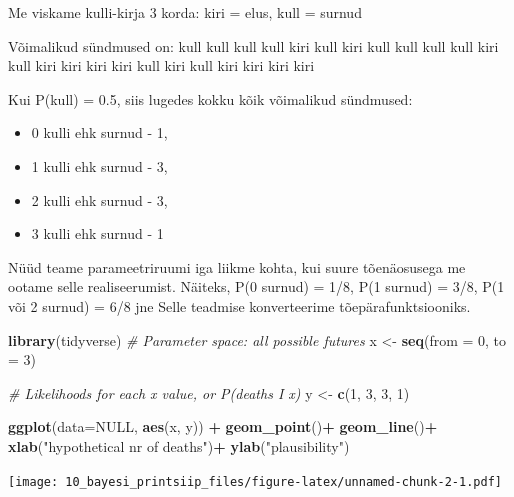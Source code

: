 \documentclass[]{book}
\newenvironment{Shaded}{\begin{snugshade}}{\end{snugshade}}
\newcommand{\KeywordTok}[1]{\textcolor[rgb]{0.13,0.29,0.53}{\textbf{#1}}}
\newcommand{\DataTypeTok}[1]{\textcolor[rgb]{0.13,0.29,0.53}{#1}}
\newcommand{\DecValTok}[1]{\textcolor[rgb]{0.00,0.00,0.81}{#1}}
\newcommand{\StringTok}[1]{\textcolor[rgb]{0.31,0.60,0.02}{#1}}
\newcommand{\CommentTok}[1]{\textcolor[rgb]{0.56,0.35,0.01}{\textit{#1}}}
\newcommand{\OtherTok}[1]{\textcolor[rgb]{0.56,0.35,0.01}{#1}}
\newcommand{\OperatorTok}[1]{\textcolor[rgb]{0.81,0.36,0.00}{\textbf{#1}}}
\newcommand{\NormalTok}[1]{#1}
\providecommand{\tightlist}{%
  \setlength{\itemsep}{0pt}\setlength{\parskip}{0pt}}
\begin{document}
Me viskame kulli-kirja 3 korda: kiri = elus, kull = surnud

Võimalikud sündmused on: \textbar{} kull kull kull \textbar{} kull kiri
kull \textbar{} kiri kull kull \textbar{} kull kull kiri \textbar{} kull
kiri kiri \textbar{} kiri kiri kull \textbar{} kiri kull kiri \textbar{}
kiri kiri kiri

Kui P(kull) = 0.5, siis lugedes kokku kõik võimalikud sündmused:

\begin{itemize}
\tightlist
\item
  0 kulli ehk surnud - 1,
\item
  1 kulli ehk surnud - 3,
\item
  2 kulli ehk surnud - 3,
\item
  3 kulli ehk surnud - 1
\end{itemize}

Nüüd teame parameetriruumi iga liikme kohta, kui suure tõenäosusega me
ootame selle realiseerumist. Näiteks, P(0 surnud) = 1/8, P(1 surnud) =
3/8, P(1 või 2 surnud) = 6/8 jne Selle teadmise konverteerime
tõepärafunktsiooniks.

\begin{Shaded}
\begin{Highlighting}[]
\KeywordTok{library}\NormalTok{(tidyverse)}
\CommentTok{# Parameter space: all possible futures}
\NormalTok{x <-}\StringTok{ }\KeywordTok{seq}\NormalTok{(}\DataTypeTok{from =} \DecValTok{0}\NormalTok{, }\DataTypeTok{to =} \DecValTok{3}\NormalTok{)}

\CommentTok{# Likelihoods for each x value, or P(deaths I x)}
\NormalTok{y <-}\StringTok{ }\KeywordTok{c}\NormalTok{(}\DecValTok{1}\NormalTok{, }\DecValTok{3}\NormalTok{, }\DecValTok{3}\NormalTok{, }\DecValTok{1}\NormalTok{)}

\KeywordTok{ggplot}\NormalTok{(}\DataTypeTok{data=}\OtherTok{NULL}\NormalTok{, }\KeywordTok{aes}\NormalTok{(x, y)) }\OperatorTok{+}\StringTok{ }
\StringTok{  }\KeywordTok{geom_point}\NormalTok{()}\OperatorTok{+}\StringTok{ }
\StringTok{  }\KeywordTok{geom_line}\NormalTok{()}\OperatorTok{+}
\StringTok{  }\KeywordTok{xlab}\NormalTok{(}\StringTok{"hypothetical nr of deaths"}\NormalTok{)}\OperatorTok{+}\StringTok{ }
\StringTok{  }\KeywordTok{ylab}\NormalTok{(}\StringTok{"plausibility"}\NormalTok{)}
\end{Highlighting}
\end{Shaded}

\texttt{[image: 10\_bayesi\_printsiip\_files/figure-latex/unnamed-chunk-2-1.pdf]}
\end{document}
